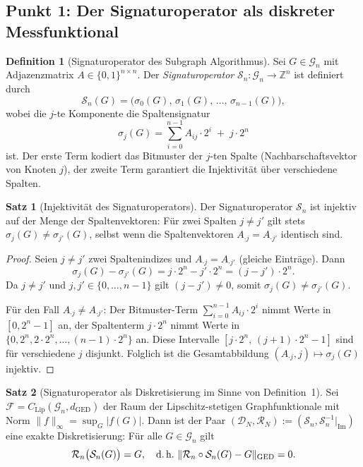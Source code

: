 ﻿\documentclass[a4paper,12pt]{article}
\theoremstyle{definition}
\newtheorem{definition}{Definition}
\newtheorem{satz}{Satz}
\begin{document}
\subsection{Punkt 1: Der Signaturoperator als diskreter Messfunktional}

\begin{definition}[Signaturoperator des Subgraph Algorithmus]
\label{def:sigop}
    Sei $G \in \mathcal{G}_n$ mit Adjazenzmatrix $A \in \{0,1\}^{n \times n}$.
    Der \emph{Signaturoperator} $\mathcal{S}_n : \mathcal{G}_n \to \mathbb{Z}^n$ ist definiert durch
    \[
    \mathcal{S}_n(G) = \bigl(\sigma_0(G),\, \sigma_1(G),\, \ldots,\, \sigma_{n-1}(G)\bigr),
    \]
    wobei die $j$-te Komponente die Spaltensignatur
    \[
    \sigma_j(G) = \sum_{i=0}^{n-1} A_{ij} \cdot 2^i \;+\; j \cdot 2^n
    \]
    ist. Der erste Term kodiert das Bitmuster der $j$-ten Spalte (Nachbarschaftsvektor von
    Knoten $j$), der zweite Term garantiert die Injektivität über verschiedene Spalten.
\end{definition}

\begin{satz}[Injektivität des Signaturoperators]
\label{satz:inj}
    Der Signaturoperator $\mathcal{S}_n$ ist injektiv auf der Menge der Spaltenvektoren:
    Für zwei Spalten $j \neq j'$ gilt stets $\sigma_j(G) \neq \sigma_{j'}(G)$, selbst wenn die
    Spaltenvektoren $A_{\cdot j} = A_{\cdot j'}$ identisch sind.
\end{satz}

\begin{proof}
    Seien $j \neq j'$ zwei Spaltenindizes und $A_{\cdot j} = A_{\cdot j'}$ (gleiche Einträge).
    Dann
    \[
    \sigma_j(G) - \sigma_{j'}(G) = j \cdot 2^n - j' \cdot 2^n = (j - j') \cdot 2^n.
    \]
    Da $j \neq j'$ und $j, j' \in \{0, \ldots, n-1\}$ gilt $(j - j') \neq 0$, somit
    $\sigma_j(G) \neq \sigma_{j'}(G)$.

    Für den Fall $A_{\cdot j} \neq A_{\cdot j'}$: Der Bitmuster-Term
    $\sum_{i=0}^{n-1} A_{ij} \cdot 2^i$ nimmt Werte in $[0, 2^n - 1]$ an, der Spaltenterm
    $j \cdot 2^n$ nimmt Werte in $\{0, 2^n, 2 \cdot 2^n, \ldots, (n-1) \cdot 2^n\}$ an.
    Diese Intervalle $[j \cdot 2^n,\, (j+1) \cdot 2^n - 1]$ sind für verschiedene $j$ disjunkt.
    Folglich ist die Gesamtabbildung $(A_{\cdot j}, j) \mapsto \sigma_j(G)$ injektiv. \qedhere
\end{proof}

\begin{satz}[Signaturoperator als Diskretisierung im Sinne von Definition~1]
\label{satz:sigdisk}
    Sei $\mathcal{F} = C_{\mathrm{Lip}}(\mathcal{G}_n, d_{\mathrm{GED}})$ der Raum der
    Lipschitz-stetigen Graphfunktionale mit Norm $\|f\|_\infty = \sup_G |f(G)|$.
    Dann ist der Paar $(\mathcal{D}_N, \mathcal{R}_N) := (\mathcal{S}_n, \mathcal{S}_n^{-1}|_{\mathrm{Im}})$
    eine exakte Diskretisierung: Für alle $G \in \mathcal{G}_n$ gilt
    \[
    \mathcal{R}_n\bigl(\mathcal{S}_n(G)\bigr) = G,\quad
    \text{d.\,h.\ }\|\mathcal{R}_n \circ \mathcal{S}_n(G) - G\|_{\mathrm{GED}} = 0.
    \]
\end{satz}
\end{document}
